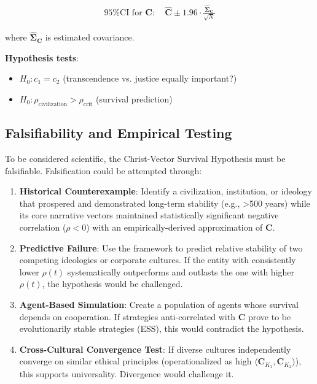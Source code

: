 \documentclass[11pt,a4paper]{article}
\theoremstyle{definition}
\theoremstyle{remark}
\begin{document}
\begin{align}
\text{95\% CI for } \mathbf{C}: \quad \hat{\mathbf{C}} \pm 1.96 \cdot \frac{\hat{\boldsymbol{\Sigma}}_{\mathbf{C}}}{\sqrt{N}}
\end{align}

where \(\hat{\boldsymbol{\Sigma}}_{\mathbf{C}}\) is estimated covariance.

\textbf{Hypothesis tests}:
\begin{itemize}
\item \(H_0: c_1 = c_2\) (transcendence vs. justice equally important?)
\item \(H_0: \rho_{\text{civilization}} > \rho_{\text{crit}}\) (survival prediction)
\end{itemize}

\subsection{Falsifiability and Empirical Testing}

To be considered scientific, the Christ-Vector Survival Hypothesis must be falsifiable. Falsification could be attempted through:

\begin{enumerate}
    \item \textbf{Historical Counterexample}: Identify a civilization, institution, or ideology that prospered and demonstrated long-term stability (e.g., >500 years) while its core narrative vectors maintained statistically significant negative correlation (\(\rho < 0\)) with an empirically-derived approximation of \(\mathbf{C}\).
    
    \item \textbf{Predictive Failure}: Use the framework to predict relative stability of two competing ideologies or corporate cultures. If the entity with consistently lower \(\rho(t)\) systematically outperforms and outlasts the one with higher \(\rho(t)\), the hypothesis would be challenged.
    
    \item \textbf{Agent-Based Simulation}: Create a population of agents whose survival depends on cooperation. If strategies anti-correlated with \(\mathbf{C}\) prove to be evolutionarily stable strategies (ESS), this would contradict the hypothesis.
    
    \item \textbf{Cross-Cultural Convergence Test}: If diverse cultures independently converge on similar ethical principles (operationalized as high \(\langle \mathbf{C}_{K_1}, \mathbf{C}_{K_2} \rangle\)), this supports universality. Divergence would challenge it.
\end{enumerate}
\end{document}
